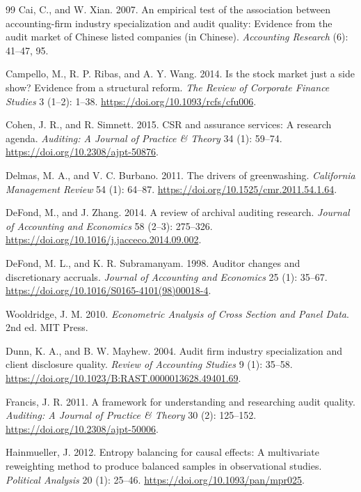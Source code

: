 \documentclass[11pt]{article}
\begin{document}
\begin{thebibliography}{99}
Cai, C., and W. Xian. 2007.
An empirical test of the association between accounting-firm industry specialization and audit quality: Evidence from the audit market of Chinese listed companies (in Chinese).
\textit{Accounting Research} (6): 41--47, 95.

Campello, M., R. P. Ribas, and A. Y. Wang. 2014.
Is the stock market just a side show? Evidence from a structural reform.
\textit{The Review of Corporate Finance Studies} 3 (1--2): 1--38. \url{https://doi.org/10.1093/rcfs/cfu006}.

Cohen, J. R., and R. Simnett. 2015.
CSR and assurance services: A research agenda.
\textit{Auditing: A Journal of Practice \& Theory} 34 (1): 59--74. \url{https://doi.org/10.2308/ajpt-50876}.

Delmas, M. A., and V. C. Burbano. 2011.
The drivers of greenwashing.
\textit{California Management Review} 54 (1): 64--87. \url{https://doi.org/10.1525/cmr.2011.54.1.64}.

DeFond, M., and J. Zhang. 2014.
A review of archival auditing research.
\textit{Journal of Accounting and Economics} 58 (2--3): 275--326. \url{https://doi.org/10.1016/j.jacceco.2014.09.002}.

DeFond, M. L., and K. R. Subramanyam. 1998.
Auditor changes and discretionary accruals.
\textit{Journal of Accounting and Economics} 25 (1): 35--67. \url{https://doi.org/10.1016/S0165-4101(98)00018-4}.

Wooldridge, J. M. 2010.
\textit{Econometric Analysis of Cross Section and Panel Data}. 2nd ed. MIT Press.

Dunn, K. A., and B. W. Mayhew. 2004.
Audit firm industry specialization and client disclosure quality.
\textit{Review of Accounting Studies} 9 (1): 35--58. \url{https://doi.org/10.1023/B:RAST.0000013628.49401.69}.

Francis, J. R. 2011.
A framework for understanding and researching audit quality.
\textit{Auditing: A Journal of Practice \& Theory} 30 (2): 125--152. \url{https://doi.org/10.2308/ajpt-50006}.

Hainmueller, J. 2012.
Entropy balancing for causal effects: A multivariate reweighting method to produce balanced samples in observational studies.
\textit{Political Analysis} 20 (1): 25--46. \url{https://doi.org/10.1093/pan/mpr025}.


\end{thebibliography}
\end{document}
